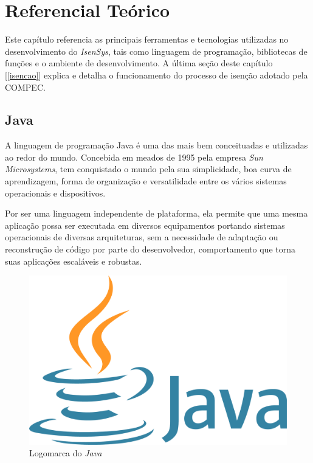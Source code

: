 \documentclass[
	12pt,			%
	openright,		%
	oneside,	
	a4paper,		%
	english,		%
	brazil			%
]{abntex2/abntex2}  %
\begin{document}
	\chapter{Referencial Teórico}
	
		Este capítulo referencia as principais ferramentas e tecnologias utilizadas no desenvolvimento do \textit{IsenSys}, tais como linguagem de programação, bibliotecas de funções e o ambiente de desenvolvimento. A última seção deste capítulo [\ref{isencao}] explica e detalha o funcionamento do processo de isenção adotado pela COMPEC.
		
		\section{Java}
		
			A linguagem de programação Java \cite{java} é uma das mais bem conceituadas e utilizadas ao redor do mundo. Concebida em meados de 1995 pela empresa \textit{Sun Microsystems}, tem conquistado o mundo pela sua simplicidade, boa curva de aprendizagem, forma de organização e versatilidade entre os vários sistemas operacionais e dispositivos.
		
			Por ser uma linguagem independente de plataforma, ela permite que uma mesma aplicação possa ser executada em diversos equipamentos portando sistemas operacionais de diversas arquiteturas, sem a necessidade de adaptação ou reconstrução de código por parte do desenvolvedor, comportamento que torna suas aplicações escaláveis e robustas.
		
			\begin{figure}[ht]
				\begin{center}
				
					\caption{Logomarca do \textit{Java}}
					\includegraphics[scale=0.04]{img/java-logo}
					
				\end{center}
			\end{figure}
		
\end{document}
